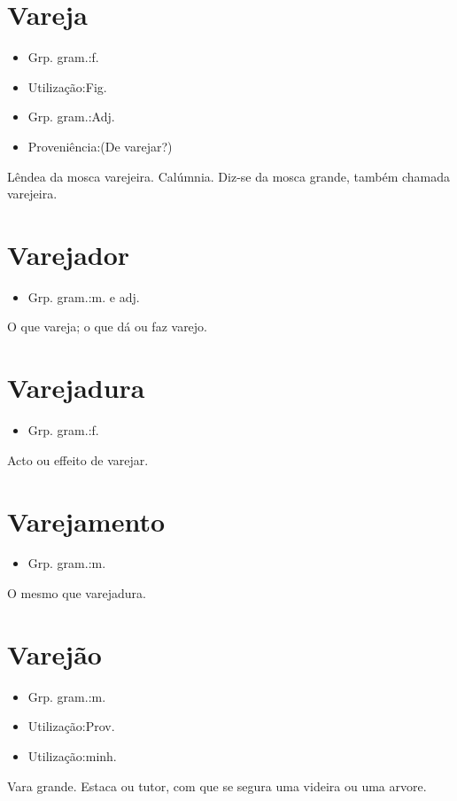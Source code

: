 \documentclass{article}
\begin{document}
\section{Vareja}
\begin{itemize}
\item {Grp. gram.:f.}
\end{itemize}
\begin{itemize}
\item {Utilização:Fig.}
\end{itemize}
\begin{itemize}
\item {Grp. gram.:Adj.}
\end{itemize}
\begin{itemize}
\item {Proveniência:(De \textunderscore varejar\textunderscore ?)}
\end{itemize}
Lêndea da mosca varejeira.
Calúmnia.
Diz-se da mosca grande, também chamada \textunderscore varejeira\textunderscore .
\section{Varejador}
\begin{itemize}
\item {Grp. gram.:m.  e  adj.}
\end{itemize}
O que vareja; o que dá ou faz varejo.
\section{Varejadura}
\begin{itemize}
\item {Grp. gram.:f.}
\end{itemize}
Acto ou effeito de varejar.
\section{Varejamento}
\begin{itemize}
\item {Grp. gram.:m.}
\end{itemize}
O mesmo que \textunderscore varejadura\textunderscore .
\section{Varejão}
\begin{itemize}
\item {Grp. gram.:m.}
\end{itemize}
\begin{itemize}
\item {Utilização:Prov.}
\end{itemize}
\begin{itemize}
\item {Utilização:minh.}
\end{itemize}
Vara grande.
Estaca ou tutor, com que se segura uma videira ou uma arvore.
\end{document}
